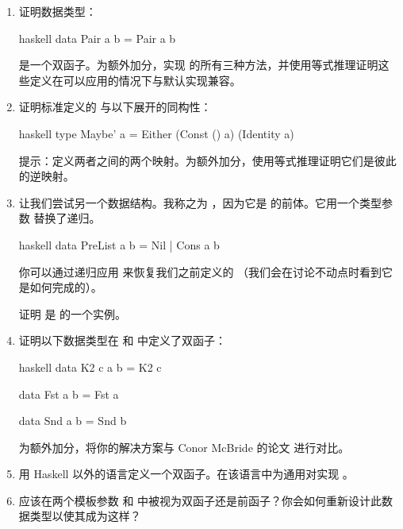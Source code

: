\begin{enumerate}
  \tightlist
  \item
  证明数据类型：

  \begin{snip}{haskell}
    data Pair a b = Pair a b
  \end{snip}

  是一个双函子。为额外加分，实现  的所有三种方法，并使用等式推理证明这些定义在可以应用的情况下与默认实现兼容。
  \item
  证明标准定义的  与以下展开的同构性：

  \begin{snip}{haskell}
    type Maybe' a = Either (Const () a) (Identity a)
  \end{snip}

  提示：定义两者之间的两个映射。为额外加分，使用等式推理证明它们是彼此的逆映射。
  \item
  让我们尝试另一个数据结构。我称之为 ，因为它是  的前体。它用一个类型参数  替换了递归。

  \begin{snip}{haskell}
    data PreList a b = Nil | Cons a b
  \end{snip}

  你可以通过递归应用  来恢复我们之前定义的 （我们会在讨论不动点时看到它是如何完成的）。

  证明  是  的一个实例。
  \item
  证明以下数据类型在  和  中定义了双函子：

  \begin{snip}{haskell}
    data K2 c a b = K2 c

    data Fst a b = Fst a

    data Snd a b = Snd b
  \end{snip}

  为额外加分，将你的解决方案与 Conor McBride 的论文  进行对比。
  \item
  用 Haskell 以外的语言定义一个双函子。在该语言中为通用对实现 。
  \item
   应该在两个模板参数  和  中被视为双函子还是前函子？你会如何重新设计此数据类型以使其成为这样？
\end{enumerate}
